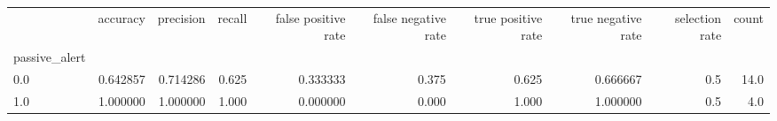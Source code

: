 \begin{tabular}{lrrrrrrrrr}
\toprule
{} &  accuracy &  precision &  recall &  false positive rate &  false negative rate &  true positive rate &  true negative rate &  selection rate &  count \\
passive\_alert &           &            &         &                      &                      &                     &                     &                 &        \\
\midrule
0.0           &  0.642857 &   0.714286 &   0.625 &             0.333333 &                0.375 &               0.625 &            0.666667 &             0.5 &   14.0 \\
1.0           &  1.000000 &   1.000000 &   1.000 &             0.000000 &                0.000 &               1.000 &            1.000000 &             0.5 &    4.0 \\
\bottomrule
\end{tabular}
